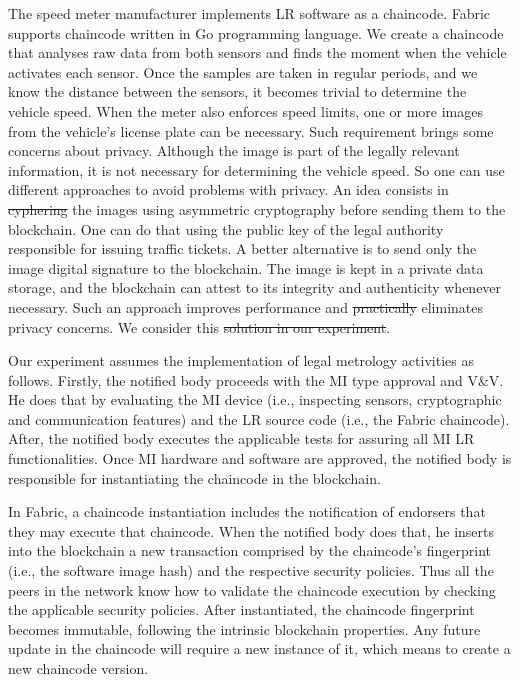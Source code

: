 \documentclass[journal]{IEEEtran}
\providecommand{\DIFadd}[1]{{\protect\color{blue}\uwave{#1}}} %
\providecommand{\DIFdel}[1]{{\protect\color{red}\sout{#1}}}                      %
\providecommand{\DIFaddbegin}{} %
\providecommand{\DIFaddend}{} %
\providecommand{\DIFdelbegin}{} %
\providecommand{\DIFdelend}{} %
\begin{document}
The speed meter manufacturer implements LR software as a chaincode. 
Fabric supports chaincode written in \DIFaddbegin \DIFadd{the }\DIFaddend Go programming language.
We create a chaincode that analyses raw data from both sensors and finds the moment when the vehicle activates each sensor.
Once the samples are taken in regular periods, and we know the distance between the sensors, it becomes trivial to determine the vehicle speed.
When the meter also enforces speed limits, one or more images from the vehicle's license plate can be necessary.
Such requirement brings some concerns about privacy.
Although the image is part of the legally relevant information, it is not necessary for determining the vehicle speed.
So one can use different approaches to avoid problems with privacy.
An idea consists in \DIFdelbegin \DIFdel{cyphering }\DIFdelend \DIFaddbegin \DIFadd{encrypting }\DIFaddend the images using asymmetric cryptography before sending them to the blockchain.
One can do that using the public key of the legal authority responsible for issuing traffic tickets.
A better alternative is to send only the image digital signature to the blockchain.
The image is kept in a private data storage, and the blockchain can attest to its integrity and authenticity whenever necessary.
Such an approach improves performance and \DIFdelbegin \DIFdel{practically }\DIFdelend eliminates privacy concerns.
We consider this \DIFdelbegin \DIFdel{solution in our experiment}\DIFdelend \DIFaddbegin \DIFadd{approach in our solution}\DIFaddend .

Our experiment assumes the implementation of legal metrology activities as follows.
Firstly, the notified body proceeds with the MI type approval and V\&V.
He does that by evaluating the MI device (i.e., inspecting sensors, cryptographic and communication features) and the LR source code (i.e., the Fabric chaincode).
After,  the notified body executes the applicable tests for assuring all MI LR functionalities.
Once MI hardware and software are approved, the notified body is responsible for instantiating the chaincode in the blockchain.

In Fabric, a chaincode instantiation includes the notification of endorsers that they may execute that chaincode.
When the notified body does that, he inserts into the blockchain a new transaction comprised by the chaincode's fingerprint (i.e., the software image hash) and the respective security policies.
Thus all the peers in the network know how to validate the chaincode execution by checking the applicable security policies.
After instantiated, the chaincode fingerprint becomes immutable, following the intrinsic blockchain properties.
Any future update in the chaincode will require a new instance of it, which means to create a new chaincode version.
\end{document}
